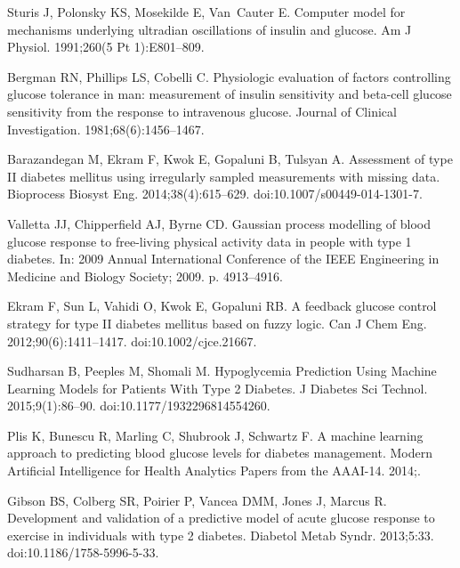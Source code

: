 \documentclass[10pt,letterpaper]{article}
\begin{document}
\begin{thebibliography}{10}
Sturis J, Polonsky KS, Mosekilde E, Van~Cauter E.
\newblock Computer model for mechanisms underlying ultradian oscillations of
  insulin and glucose.
\newblock Am J Physiol. 1991;260(5 Pt 1):E801--809.

Bergman RN, Phillips LS, Cobelli C.
\newblock Physiologic evaluation of factors controlling glucose tolerance in
  man: measurement of insulin sensitivity and beta-cell glucose sensitivity
  from the response to intravenous glucose.
\newblock Journal of Clinical Investigation. 1981;68(6):1456--1467.

Barazandegan M, Ekram F, Kwok E, Gopaluni B, Tulsyan A.
\newblock Assessment of type {II} diabetes mellitus using irregularly sampled
  measurements with missing data.
\newblock Bioprocess Biosyst Eng. 2014;38(4):615--629.
\newblock doi:{10.1007/s00449-014-1301-7}.

Valletta JJ, Chipperfield AJ, Byrne CD.
\newblock Gaussian process modelling of blood glucose response to free-living
  physical activity data in people with type 1 diabetes.
\newblock In: 2009 {Annual} {International} {Conference} of the {IEEE}
  {Engineering} in {Medicine} and {Biology} {Society}; 2009. p. 4913--4916.

Ekram F, Sun L, Vahidi O, Kwok E, Gopaluni RB.
\newblock A feedback glucose control strategy for type {II} diabetes mellitus
  based on fuzzy logic.
\newblock Can J Chem Eng. 2012;90(6):1411--1417.
\newblock doi:{10.1002/cjce.21667}.

Sudharsan B, Peeples M, Shomali M.
\newblock Hypoglycemia {Prediction} {Using} {Machine} {Learning} {Models} for
  {Patients} {With} {Type} 2 {Diabetes}.
\newblock J Diabetes Sci Technol. 2015;9(1):86--90.
\newblock doi:{10.1177/1932296814554260}.

Plis K, Bunescu R, Marling C, Shubrook J, Schwartz F.
\newblock A machine learning approach to predicting blood glucose levels for
  diabetes management.
\newblock Modern Artificial Intelligence for Health Analytics Papers from the
  AAAI-14. 2014;.

Gibson BS, Colberg SR, Poirier P, Vancea DMM, Jones J, Marcus R.
\newblock Development and validation of a predictive model of acute glucose
  response to exercise in individuals with type 2 diabetes.
\newblock Diabetol Metab Syndr. 2013;5:33.
\newblock doi:{10.1186/1758-5996-5-33}.


\end{thebibliography}
\end{document}
